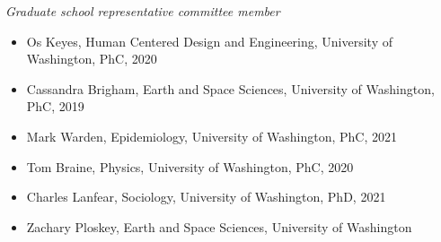 \medskip

\noindent\emph{Graduate school representative committee member\vspace{0.01in}}

\medskip

\begin{itemize}[noitemsep, font=$\bullet$\scshape\bfseries]

\item Os Keyes, Human Centered Design and Engineering, University of Washington, PhC, 2020

\item Cassandra Brigham, Earth and Space Sciences, University of Washington, PhC, 2019

\item Mark Warden, Epidemiology, University of Washington, PhC, 2021 

\item Tom Braine, Physics, University of Washington, PhC, 2020  

\item Charles Lanfear, Sociology, University of Washington, PhD, 2021  

\item Zachary Ploskey, Earth and Space Sciences, University of Washington

\end{itemize}

